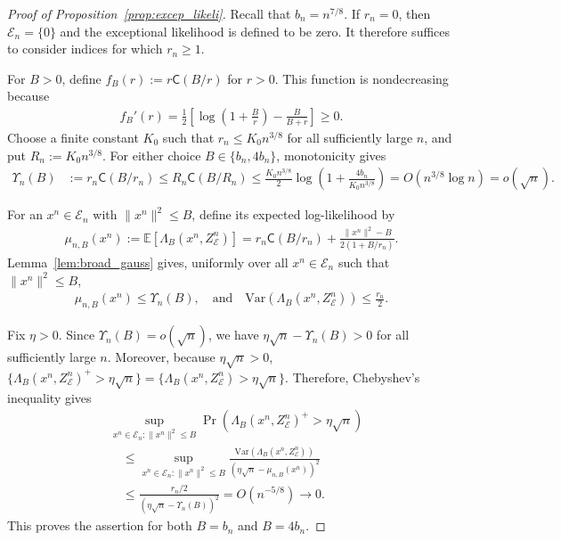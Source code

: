 \documentclass[10pt,a4paper]{amsart}
\newcommand{\calE}{\mathcal{E}}
\newcommand{\rvC}{\mathsf{C}}
\begin{document}
\begin{proof}[Proof of Proposition~\ref{prop:excep_likeli}]
Recall that $b_n=n^{7/8}$. If $r_n=0$, then $\calE_n=\{0\}$ and the
exceptional likelihood is defined to be zero. It therefore suffices to
consider indices for which $r_n\ge1$.

For $B>0$, define $f_B(r):=r\rvC(B/r)$ for $ r>0$.
This function is nondecreasing because
\begin{align}
f_B'(r)
=\frac12\left[
\log\left(1+\frac Br\right)-\frac{B}{B+r}
\right]\ge0.
\end{align}
Choose a finite constant $K_0$ such that
$r_n\le K_0n^{3/8}$ for all sufficiently large $n$, and put $R_n:=K_0n^{3/8}$.
For either choice $B\in\{b_n,4b_n\}$, monotonicity gives
\begin{align}
\Upsilon_n(B)
&:=r_n\rvC(B/r_n)\le R_n\rvC(B/R_n)
\le
\frac{K_0n^{3/8}}{2}
\log\left(1+\frac{4b_n}{K_0n^{3/8}}\right)=O(n^{3/8}\log n)
=o(\sqrt n).
\label{eqn:broad-cost}
\end{align}

For an   $x^n\in\calE_n$ with $\|x^n\|^2\le B$, define its expected log-likelihood by
\begin{align}
\mu_{n,B}(x^n)
:=\mathbb E[\Lambda_B(x^n,Z_{\calE}^n)]=
r_n\rvC(B/r_n)
+\frac{\|x^n\|^2-B}{2(1+B/r_n)}.
\end{align}
Lemma~\ref{lem:broad_gauss} gives, uniformly over all $x^n\in\calE_n $ such that $\|x^n\|^2\le B$,
\begin{align}
\mu_{n,B}(x^n)\le \Upsilon_n(B),
\quad\mbox{and}\quad
\mathrm{Var}(\Lambda_B(x^n,Z_{\calE}^n))\le\frac{r_n}{2}.
\end{align}

Fix $\eta>0$. Since $\Upsilon_n(B)=o(\sqrt n)$, we have
$\eta\sqrt n-\Upsilon_n(B)>0$ for all sufficiently large $n$. Moreover,
because $\eta\sqrt n>0$, $ 
\{\Lambda_B(x^n,Z_{\calE}^n)^+>\eta\sqrt n\}
=
\{\Lambda_B(x^n,Z_{\calE}^n)>\eta\sqrt n\}.
$ 
Therefore, Chebyshev's inequality gives
\begin{align}
&\sup_{x^n\in\calE_n: \|x^n\|^2\le B}
\Pr\left(
\Lambda_B(x^n,Z_{\calE}^n)^+>\eta\sqrt n
\right)
\nonumber\\
&\quad\le
\sup_{x^n\in\calE_n: \|x^n\|^2\le B}
\frac{\mathrm{Var}(\Lambda_B(x^n,Z_{\calE}^n))}
     {(\eta\sqrt n-\mu_{n,B}(x^n))^2}
\nonumber\\
&\quad\le
\frac{r_n/2}{(\eta\sqrt n-\Upsilon_n(B))^2}
=O(n^{-5/8}) \to0.
\end{align}
This proves the assertion for both $B=b_n$ and $B=4b_n$.
\end{proof}
\end{document}
